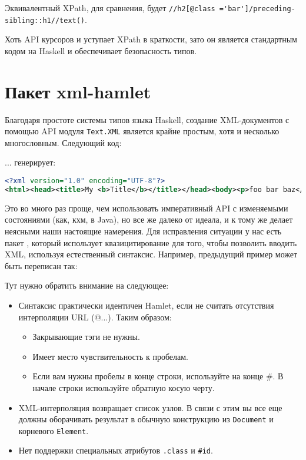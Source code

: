 \begin{remark}
Эквивалентный XPath, для сравнения, будет \lstinline!//h2[@class ='bar']/preceding-sibling::h1//text()!.
\end{remark}

Хоть API курсоров и уступает XPath в краткости, зато он является стандартным кодом на Haskell и обеспечивает безопасность типов.

\section{Пакет xml-hamlet}

Благодаря простоте системы типов языка Haskell, создание XML-документов с помощью API модуля \lstinline!Text.XML! является крайне простым, хотя и несколько многословным. Следующий код:


... генерирует:

\begin{lstlisting}[language=XML]
<?xml version="1.0" encoding="UTF-8"?>
<html><head><title>My <b>Title</b></title></head><body><p>foo bar baz</p></body></html>
\end{lstlisting}

Это во много раз проще, чем использовать императивный API с изменяемыми состояниями (как, кхм, в Java), но все же далеко от идеала, и к тому же делает неясными наши настоящие намерения. Для исправления ситуации у нас есть пакет , который использует квазицитирование для того, чтобы позволить вводить XML, используя естественный синтаксис. Например, предыдущий пример может быть переписан так:


Тут нужно обратить внимание на следующее:

\begin{itemize}
  \item Синтаксис практически идентичен Hamlet, если не считать отсутствия интерполяции URL (@{...}). Таким образом:
    \begin{itemize}
      \item Закрывающие тэги не нужны.
      \item Имеет место чувствительность к пробелам.
      \item Если вам нужны пробелы в конце строки, используйте на конце \#. В начале строки используйте обратную косую черту.
    \end{itemize}
  
  \item XML-интерполяция возвращает список узлов. В связи с этим вы все еще должны оборачивать результат в обычную конструкцию из \lstinline!Document! и корневого \lstinline!Element!.
  \item Нет поддержки специальных атрибутов \lstinline!.class! и \lstinline!#id!.
\end{itemize}

